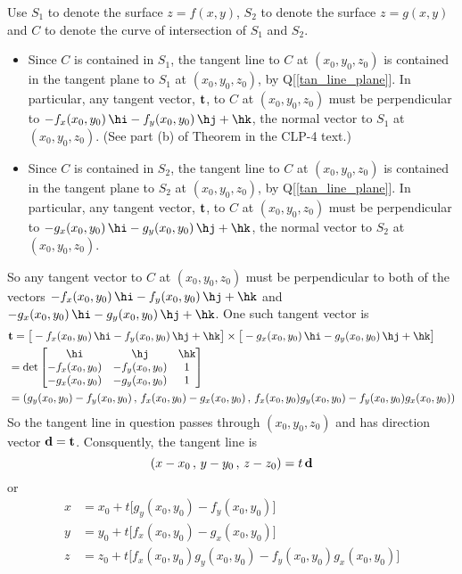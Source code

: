 \begin{solution}
Use $S_1$ to denote the surface $z=f(x,y)$, 
    $S_2$ to denote the surface $z=g(x,y)$ and 
    $C$ to denote the curve of intersection of $S_1$ and $S_2$.
\begin{itemize}
\item
Since $C$ is contained in $S_1$, the tangent line to $C$ at $(x_0,y_0,z_0)$
is contained in the tangent plane to $S_1$ at $(x_0,y_0,z_0)$, by 
Q[\ref{tan_line_plane}]. In particular, any tangent vector, $\mathbf{t}$, to 
$C$ at $(x_0,y_0,z_0)$ must be perpendicular to $-f_x(x_0,y_0)\,\hi
-f_y(x_0,y_0)\,\hj+\hk$,
the normal vector to $S_1$ at $(x_0,y_0,z_0)$.
(See part (b) of Theorem  in the CLP-4 text.)

\item
Since $C$ is contained in $S_2$, the tangent line to $C$ at $(x_0,y_0,z_0)$
is contained in the tangent plane to $S_2$ at $(x_0,y_0,z_0)$, by 
Q[\ref{tan_line_plane}]. In particular, any tangent vector, $\mathbf{t}$, to 
$C$ at $(x_0,y_0,z_0)$ must be perpendicular to $-g_x(x_0,y_0)\,\hi
-g_y(x_0,y_0)\,\hj+\hk$,
the normal vector to $S_2$ at $(x_0,y_0,z_0)$.
\end{itemize}
So any tangent vector to $C$ at $(x_0,y_0,z_0)$ must be perpendicular to
both of the vectors $-f_x(x_0,y_0)\,\hi-f_y(x_0,y_0)\,\hj+\hk$ and
$-g_x(x_0,y_0)\,\hi -g_y(x_0,y_0)\,\hj+\hk$.
One such tangent vector is
\begin{align*}
&\vt = \big[-f_x(x_0,y_0)\,\hi - f_y(x_0,y_0)\,\hj+\hk\big]\times 
       \big[-g_x(x_0,y_0)\,\hi - g_y(x_0,y_0)\,\hj+\hk\big] \\
    &=\det\left[\begin{matrix}
                     \hi &        \hj &   \hk \\
           -f_x(x_0,y_0) & -f_y(x_0,y_0) & 1 \\
           -g_x(x_0,y_0) & -g_y(x_0,y_0) & 1
                \end{matrix}\right] \\
    &=\left( g_y(x_0,y_0)-f_y(x_0,y_0)\,,\,
           f_x(x_0,y_0)-g_x(x_0,y_0)\,,\,
           f_x(x_0,y_0)g_y(x_0,y_0)-f_y(x_0,y_0)g_x(x_0,y_0)\right)
\end{align*}
So the tangent line in question passes through $(x_0,y_0,z_0)$ and has 
direction vector $\mathbf{d}=\mathbf{t}$. Consquently, the tangent line is 
\begin{equation*}
\left( x-x_0\,,\,y-y_0\,,\,z-z_0\right) = t\,\mathbf{d}
\end{equation*}
or
\begin{align*}
x&=x_0+t\big[g_y(x_0,y_0)-f_y(x_0,y_0)\big] \\
y&=y_0+t\big[f_x(x_0,y_0)-g_x(x_0,y_0)\big] \\
z&=z_0+ t\big[f_x(x_0,y_0)g_y(x_0,y_0)-f_y(x_0,y_0)g_x(x_0,y_0)\big]
\end{align*}
\end{solution}




